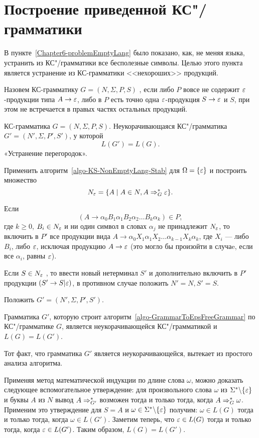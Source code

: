 \section{Построение приведенной КС"/грамматики}
\label{Chapter6-normalizeGrammar}

В пункте~\ref{Chapter6-problemEmptyLang} было показано, как, не меняя языка, устранить из КС"/грамматики все бесполезные символы. Целью этого пункта является устранение из КС-грамматики <<нехороших>> продукций.

Назовем КС-грамматику $G=(N,\Sigma,P,S)$ , если либо $P$ вовсе не содержит $\varepsilon$-продукции типа $A\to\varepsilon$, либо в $P$ есть точно одна $\varepsilon$-продукция $S\to\varepsilon$ и $S$, при этом не встречается в правых частях остальных продукций.

{\label{algo-GrammarToEpsFreeGrammar}КС-грамматика $G=(N,\Sigma,P,S)$.}
{Неукорачивающаяся КС"/грамматика $G'=(N',\Sigma,P',S')$, у которой \[L(G')=L(G).\]}
{«Устранение перегородок».}
{
\item Применить алгоритм~\ref{algo-KS-NonEmptyLang-Stab} для $\Omega=\{\varepsilon\}$ и построить множество
\[
    N_\varepsilon=\{A\mid A\in N, A\Rightarrow_G^*\varepsilon\}.
\]

\item Если
\[
    (A\to\alpha_0B_1\alpha_1B_2\alpha_2 \ldots B_k\alpha_k)\in P,
\]
где $k\ge 0$, $B_i\in N_\varepsilon$ и ни один символ в словах $\alpha_j$ не принадлежит $N_\varepsilon$, то включить в $P'$ все продукции вида $A\to\alpha_0X_1\alpha_1X_2 \ldots \alpha_{k-1}X_k\alpha_k$, где $X_i$ --- либо $B_i$, либо $\varepsilon$, исключая продукцию $A\to\varepsilon$ (это могло бы произойти в случаe, если все $\alpha_i$, равны $\varepsilon$).

\item Если $S\in N_\varepsilon$ , то ввести новый нетерминал $S'$ и дополнительно включить в $P'$ продукции $(S'\to S|\varepsilon)$, в противном случае положить $N'=N, S'=S$.

\item Положить $G'=(N',\Sigma,P',S')$.
}

\begin{mytheorem}
\label{theorem-AlgoDelEpsProductionsCorrectness}
Грамматика $G'$, которую строит алгоритм~\ref{algo-GrammarToEpsFreeGrammar} по КС"/грамматике $G$, является неукорачивающейся КС"/грамматикой и $L(G)=L(G')$.
\end{mytheorem}

\begin{myproof}
Тот факт, что грамматика $G'$ является неукорачивающейся, вытекает из простого анализа алгоритма.

Применяя метод математической индукции по длине слова $\omega$, можно доказать следующее вспомогательное утверждение: для произвольного слова $\omega$ из $\Sigma^*\backslash\{\varepsilon\}$ и буквы $A$ из $N$ вывод $A\Rightarrow_{G'}^*$ возможен тогда и только тогда, когда $A\Rightarrow_G^*\omega$. Применим это утверждение для $S=A$ и $\omega\in\Sigma^*\backslash\{\varepsilon\}$ получим: $\omega\in L(G)$ тогда и только тогда, когда $\omega\in L(G')$. Заметим теперь, что $\varepsilon\in L(G)$ тогда и только тогда, когда $\varepsilon\in L(G')$. Таким образом, $L(G)=L(G')$.
\end{myproof}

